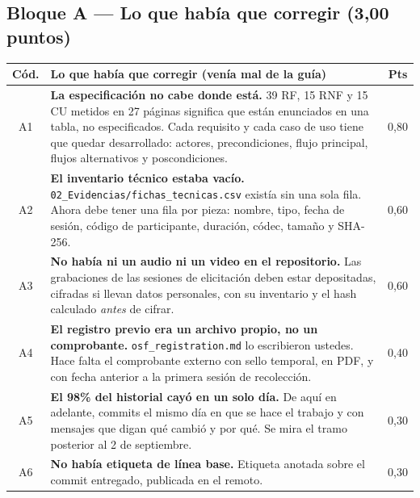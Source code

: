 \documentclass[11pt,a4paper]{article}
\newcommand{\cabA}{\toprule \textbf{Cód.} & \textbf{Lo que había que corregir (venía mal de la guía)} & \textbf{Pts} \\ \midrule}
\begin{document}
\subsection*{Bloque A — Lo que había que corregir (3,00 puntos)}
\begin{xltabular}{\textwidth}{@{}c>{\raggedright\arraybackslash}X c@{}}
\cabA
A1 & \textbf{La especificación no cabe donde está.} 39 RF, 15 RNF y 15 CU metidos en 27 páginas significa que están enunciados en una tabla, no especificados. Cada requisito y cada caso de uso tiene que quedar desarrollado: actores, precondiciones, flujo principal, flujos alternativos y poscondiciones. & 0{,}80 \\ \addlinespace
A2 & \textbf{El inventario técnico estaba vacío.} \texttt{02\_Evidencias/fichas\_tecnicas.csv} existía sin una sola fila. Ahora debe tener una fila por pieza: nombre, tipo, fecha de sesión, código de participante, duración, códec, tamaño y SHA-256. & 0{,}60 \\ \addlinespace
A3 & \textbf{No había ni un audio ni un video en el repositorio.} Las grabaciones de las sesiones de elicitación deben estar depositadas, cifradas si llevan datos personales, con su inventario y el hash calculado \emph{antes} de cifrar. & 0{,}60 \\ \addlinespace
A4 & \textbf{El registro previo era un archivo propio, no un comprobante.} \texttt{osf\_registration.md} lo escribieron ustedes. Hace falta el comprobante externo con sello temporal, en PDF, y con fecha anterior a la primera sesión de recolección. & 0{,}40 \\ \addlinespace
A5 & \textbf{El 98\% del historial cayó en un solo día.} De aquí en adelante, commits el mismo día en que se hace el trabajo y con mensajes que digan qué cambió y por qué. Se mira el tramo posterior al 2 de septiembre. & 0{,}30 \\ \addlinespace
A6 & \textbf{No había etiqueta de línea base.} Etiqueta anotada sobre el commit entregado, publicada en el remoto. & 0{,}30 \\
\bottomrule
\end{xltabular}
\end{document}
